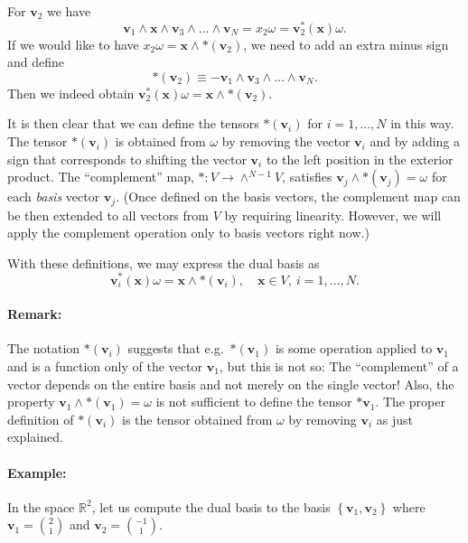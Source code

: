 For $\mathbf{v}_{2}$ we have\[
\mathbf{v}_{1}\wedge\mathbf{x}\wedge\mathbf{v}_{3}\wedge...\wedge\mathbf{v}_{N}=x_{2}\omega=\mathbf{v}_{2}^{*}(\mathbf{x})\omega.\]
 If we would like to have $x_{2}\omega=\mathbf{x}\wedge*(\mathbf{v}_{2})$,
we need to add an extra minus sign and define\[
*\left(\mathbf{v}_{2}\right)\equiv-\mathbf{v}_{1}\wedge\mathbf{v}_{3}\wedge...\wedge\mathbf{v}_{N}.\]
Then we indeed obtain $\mathbf{v}_{2}^{*}(\mathbf{x})\omega=\mathbf{x}\wedge*(\mathbf{v}_{2})$. 

It is then clear that we can define the tensors $*(\mathbf{v}_{i})$
for $i=1,...,N$ in this way. The tensor $*(\mathbf{v}_{i})$ is obtained
from $\omega$ by removing the vector $\mathbf{v}_{i}$ and by adding
a sign that corresponds to shifting the vector $\mathbf{v}_{i}$ to
the left position in the exterior product. The {}``complement''
map, $*:V\rightarrow\wedge^{N-1}V$, satisfies $\mathbf{v}_{j}\wedge*(\mathbf{v}_{j})=\omega$
for each \emph{basis} vector $\mathbf{v}_{j}$. (Once defined on the
basis vectors, the complement map can be then extended to all vectors
from $V$ by requiring linearity. However, we will apply the complement
operation only to basis vectors right now.)

With these definitions, we may express the dual basis as\[
\mathbf{v}_{i}^{*}(\mathbf{x})\omega=\mathbf{x}\wedge*(\mathbf{v}_{i}),\quad\mathbf{x}\in V,\: i=1,...,N.\]



\paragraph{Remark:}

The notation $*(\mathbf{v}_{i})$ suggests that e.g.~$*(\mathbf{v}_{1})$
is some operation applied to $\mathbf{v}_{1}$ and is a function only
of the vector $\mathbf{v}_{1}$, but this is not so: The {}``complement''
of a vector depends on the entire basis and not merely on the single
vector! Also, the property $\mathbf{v}_{1}\wedge*(\mathbf{v}_{1})=\omega$
is not sufficient to define the tensor $*\mathbf{v}_{1}$. The proper
definition of $*(\mathbf{v}_{i})$ is the tensor obtained from $\omega$
by removing $\mathbf{v}_{i}$ as just explained.


\paragraph{Example:}

In the space $\mathbb{R}^{2}$, let us compute the dual basis to the
basis $\left\{ \mathbf{v}_{1},\mathbf{v}_{2}\right\} $ where $\mathbf{v}_{1}={2 \choose 1}$
and $\mathbf{v}_{2}={-1 \choose 1}$.

